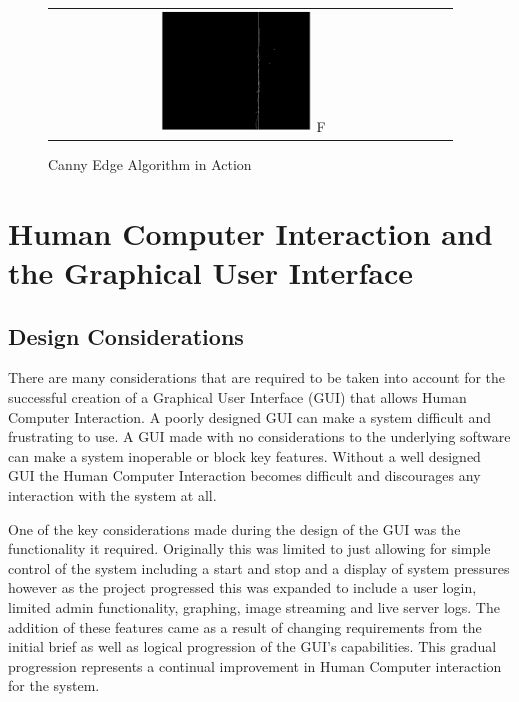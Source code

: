 \begin{figure}[H]
\begin{tabular}{cc}
		\includegraphics[width=0.4\textwidth]{figures/dila_blur9thresh35_2.png} F
	\end{tabular}
	\caption{Canny Edge Algorithm in Action}
	\label{canny_demo}
\end{figure}





\section{Human Computer Interaction and the Graphical User Interface}\label{Human Computer Interaction and the Graphical User Interface}

\subsection{Design Considerations}

There are many considerations that are required to be taken into account for the successful creation of a Graphical User Interface (GUI) that allows Human Computer Interaction.  A poorly designed GUI can make a system difficult and frustrating to use. A GUI made with no considerations to the underlying software can make a system inoperable or block key features.  Without a well designed GUI the Human Computer Interaction becomes difficult and discourages any interaction with the system at all.

	One of the key considerations made during the design of the GUI was the functionality it required.  Originally this was limited to just allowing for simple control of the system including a start and stop and a display of system pressures however as the project progressed this was expanded to include a user login, limited admin functionality, graphing, image streaming and live server logs.  The addition of these features came as a result of changing requirements from the initial brief as well as logical progression of the GUI's capabilities.  This gradual progression represents a continual improvement in Human Computer interaction for the system.  

